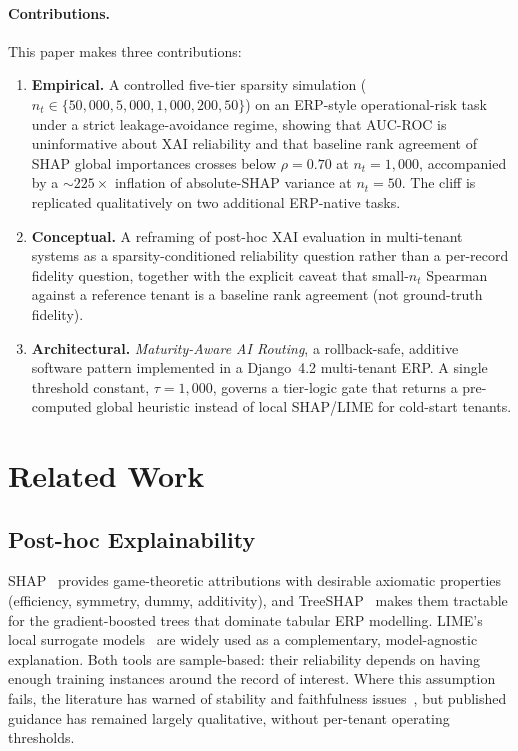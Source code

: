 \documentclass[conference]{IEEEtran}
\newcommand{\auc}{AUC\nobreakdash-ROC}
\newcommand{\nT}{n_t}
\begin{document}
\paragraph*{Contributions.} This paper makes three contributions:
\begin{enumerate}
  \item \textbf{Empirical.} A controlled five-tier sparsity simulation
        ($\nT \in \{50{,}000, 5{,}000, 1{,}000, 200, 50\}$) on an ERP-style
        operational-risk task under a strict leakage-avoidance regime,
        showing that \auc{} is uninformative about XAI reliability and
        that baseline rank agreement of SHAP global importances crosses
        below $\rho = 0.70$ at $\nT = 1{,}000$, accompanied by a
        $\sim\!225\times$ inflation of absolute-SHAP variance at
        $\nT = 50$. The cliff is replicated qualitatively on two
        additional ERP-native tasks.
  \item \textbf{Conceptual.} A reframing of post-hoc XAI evaluation in
        multi-tenant systems as a sparsity-conditioned reliability
        question rather than a per-record fidelity question, together
        with the explicit caveat that small-$\nT$ Spearman against a
        reference tenant is a baseline rank agreement (not ground-truth
        fidelity).
  \item \textbf{Architectural.} \emph{Maturity-Aware AI Routing}, a
        rollback-safe, additive software pattern implemented in a
        Django~4.2 multi-tenant ERP. A single threshold constant,
        $\tau = 1{,}000$, governs a tier-logic gate that returns a
        pre-computed global heuristic instead of local SHAP/LIME for
        cold-start tenants.
\end{enumerate}

\section{Related Work}
\label{sec:related}

\subsection{Post-hoc Explainability}
SHAP~\cite{lundberg2017unified} provides game-theoretic attributions with
desirable axiomatic properties (efficiency, symmetry, dummy, additivity),
and TreeSHAP~\cite{lundberg2020local} makes them tractable for the
gradient-boosted trees that dominate tabular ERP modelling. LIME's
local surrogate models~\cite{ribeiro2016why} are widely used as a
complementary, model-agnostic explanation. Both tools are sample-based:
their reliability depends on having enough training instances around the
record of interest. Where this assumption fails, the literature has
warned of stability and faithfulness issues~\cite{lipton2018mythos,
rudin2019stop}, but published guidance has remained largely qualitative,
without per-tenant operating thresholds.
\end{document}
